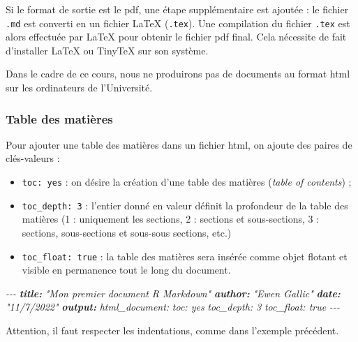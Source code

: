 \documentclass[
  11pt,
]{book}
\newenvironment{Shaded}{\begin{snugshade}}{\end{snugshade}}
\newcommand{\AnnotationTok}[1]{\textcolor[rgb]{0.56,0.35,0.01}{\textbf{\textit{#1}}}}
\newcommand{\CommentTok}[1]{\textcolor[rgb]{0.56,0.35,0.01}{\textit{#1}}}
\providecommand{\tightlist}{%
  \setlength{\itemsep}{0pt}\setlength{\parskip}{0pt}}
\numberwithin{equation}{section}
\numberwithin{countremarque}{section}
\newenvironment{notebox}{
  \begin{tcolorbox}[breakable, colback=jaune,coltext=black,
                  colframe=grisfonce]}
 {\end{tcolorbox}}
\begin{document}
Si le format de sortie est le pdf, une étape supplémentaire est ajoutée : le fichier \texttt{.md} est converti en un fichier LaTeX (\texttt{.tex}). Une compilation du fichier \texttt{.tex} est alors effectuée par LaTeX pour obtenir le fichier pdf final. Cela nécessite de fait d'installer LaTeX ou TinyTeX sur son système.

\begin{notebox}
Dans le cadre de ce cours, nous ne produirons pas de documents au format html sur les ordinateurs de l'Université.

\end{notebox}

\hypertarget{table-des-matiuxe8res}{%
\subsubsection{Table des matières}\label{table-des-matiuxe8res}}

Pour ajouter une table des matières dans un fichier html, on ajoute des paires de clés-valeurs :

\begin{itemize}
\tightlist
\item
  \texttt{toc:\ yes} : on désire la création d'une table des matières (\emph{table of contents}) ;
\item
  \texttt{toc\_depth:\ 3} : l'entier donné en valeur définit la profondeur de la table des matières (1 : uniquement les sections, 2 : sections et sous-sections, 3 : sections, sous-sections et sous-sous sections, etc.)
\item
  \texttt{toc\_float:\ true} : la table des matières sera insérée comme objet flotant et visible en permanence tout le long du document.
\end{itemize}

\begin{Shaded}
\begin{Highlighting}[]
\CommentTok{{-}{-}{-}}
\AnnotationTok{title:}\CommentTok{ "Mon premier document R Markdown"}
\AnnotationTok{author:}\CommentTok{ "Ewen Gallic"}
\AnnotationTok{date:}\CommentTok{ "11/7/2022"}
\AnnotationTok{output:}\CommentTok{ html\_document:}
\CommentTok{    toc: yes}
\CommentTok{    toc\_depth: 3}
\CommentTok{    toc\_float: true}
\CommentTok{{-}{-}{-}}
\end{Highlighting}
\end{Shaded}

\begin{notebox}
Attention, il faut respecter les indentations, comme dans l'exemple précédent.

\end{notebox}
\end{document}
